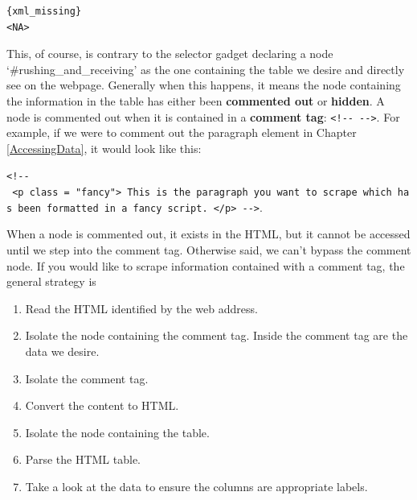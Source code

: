 \documentclass[
]{article}
\newenvironment{Shaded}{\begin{snugshade}}{\end{snugshade}}
\newcommand{\CommentTok}[1]{\textcolor[rgb]{0.56,0.35,0.01}{\textit{#1}}}
\newcommand{\DataTypeTok}[1]{\textcolor[rgb]{0.13,0.29,0.53}{#1}}
\newcommand{\KeywordTok}[1]{\textcolor[rgb]{0.13,0.29,0.53}{\textbf{#1}}}
\newcommand{\NormalTok}[1]{#1}
\newcommand{\OperatorTok}[1]{\textcolor[rgb]{0.81,0.36,0.00}{\textbf{#1}}}
\newcommand{\StringTok}[1]{\textcolor[rgb]{0.31,0.60,0.02}{#1}}
\providecommand{\tightlist}{%
  \setlength{\itemsep}{0pt}\setlength{\parskip}{0pt}}
\begin{document}
\begin{Shaded}
\end{Shaded}

\begin{verbatim}
{xml_missing}
<NA>
\end{verbatim}

This, of course, is contrary to the selector gadget declaring a node `\#rushing\_and\_receiving' as the one containing the table we desire and directly see on the webpage. Generally when this happens, it means the node containing the information in the table has either been \textbf{commented out} or \textbf{hidden}. A node is commented out when it is contained in a \textbf{comment tag}: \texttt{\textless{}!-\/-\ -\/-\textgreater{}}. For example, if we were to comment out the paragraph element in Chapter \ref{AccessingData}, it would look like this:

\texttt{\textless{}!-\/-\ \textless{}p\ class\ =\ "fancy"\textgreater{}\ This\ is\ the\ paragraph\ you\ want\ to\ scrape\ which\ has\ been\ formatted\ in\ a\ fancy\ script.\ \textless{}/p\textgreater{}\ -\/-\textgreater{}}.

When a node is commented out, it exists in the HTML, but it cannot be accessed until we step into the comment tag. Otherwise said, we can't bypass the comment node. If you would like to scrape information contained with a comment tag, the general strategy is

\begin{enumerate}
\def\labelenumi{\arabic{enumi}.}
\tightlist
\item
  Read the HTML identified by the web address.
\item
  Isolate the node containing the comment tag. Inside the comment tag are the data we desire.
\item
  Isolate the comment tag.
\item
  Convert the content to HTML.
\item
  Isolate the node containing the table.
\item
  Parse the HTML table.
\item
  Take a look at the data to ensure the columns are appropriate labels.
\end{enumerate}
\end{document}
